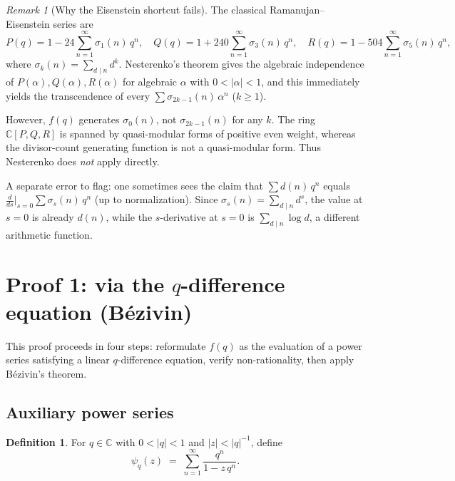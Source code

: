 \documentclass[12pt]{amsart}
\theoremstyle{definition}
\newtheorem{definition}[theorem]{Definition}
\theoremstyle{remark}
\newtheorem{remark}[theorem]{Remark}
\begin{document}
\begin{remark}[Why the Eisenstein shortcut fails]\label{rmk:eisenstein}
The classical Ramanujan--Eisenstein series are
\[
  P(q) = 1-24\sum_{n=1}^{\infty}\sigma_1(n)\,q^n, \quad
  Q(q) = 1+240\sum_{n=1}^{\infty}\sigma_3(n)\,q^n, \quad
  R(q) = 1-504\sum_{n=1}^{\infty}\sigma_5(n)\,q^n,
\]
where $\sigma_k(n)=\sum_{d\mid n}d^k$. Nesterenko's theorem
\cite{nesterenko} gives the algebraic independence of
$P(\alpha),Q(\alpha),R(\alpha)$ for algebraic $\alpha$ with
$0<|\alpha|<1$, and this immediately yields the transcendence of
every $\sum\sigma_{2k-1}(n)\,\alpha^n$ ($k\ge 1$).

However, $f(q)$ generates $\sigma_0(n)$, not $\sigma_{2k-1}(n)$ for
any $k$. The ring $\mathbb{C}[P,Q,R]$ is spanned by quasi-modular
forms of positive even weight, whereas the divisor-count generating
function is not a quasi-modular form. Thus Nesterenko does
\emph{not} apply directly.

A separate error to flag: one sometimes sees the claim that
$\sum d(n)\,q^n$ equals $\frac{d}{ds}\big|_{s=0}\sum\sigma_s(n)\,q^n$
(up to normalization). Since $\sigma_s(n)=\sum_{d\mid n}d^s$, the
value at $s=0$ is already $d(n)$, while the $s$-derivative at
$s=0$ is $\sum_{d\mid n}\log d$, a different arithmetic function.
\end{remark}

\section{Proof 1: via the $q$-difference equation (B\'ezivin)}
\label{sec:bezivin}

This proof proceeds in four steps: reformulate $f(q)$ as the
evaluation of a power series satisfying a linear $q$-difference
equation, verify non-rationality, then apply B\'ezivin's theorem.

\subsection{Auxiliary power series}\label{ss:aux}

\begin{definition}\label{def:psi}
For $q\in\mathbb{C}$ with $0<|q|<1$ and $|z|<|q|^{-1}$, define
\begin{equation}\label{eq:psi}
  \psi_q(z) \;=\; \sum_{n=1}^{\infty}\frac{q^n}{1-z\,q^n}.
\end{equation}
\end{definition}
\end{document}
